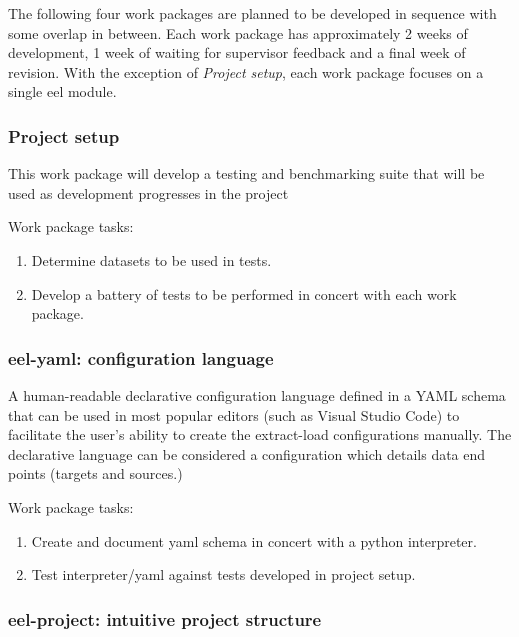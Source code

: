 The following four work packages are planned to be developed in sequence
with some overlap in between. Each work package has approximately 2
weeks of development, 1 week of waiting for supervisor feedback and a
final week of revision. With the exception of \emph{Project setup}, each
work package focuses on a single eel module.

\subsubsection{Project setup}\label{project-setup}

This work package will develop a testing and benchmarking suite that
will be used as development progresses in the project

Work package tasks:

\begin{enumerate}
\def\labelenumi{\arabic{enumi}.}
\tightlist
\item
  Determine datasets to be used in tests.
\item
  Develop a battery of tests to be performed in concert with each work
  package.
\end{enumerate}

\subsubsection{eel-yaml: configuration
language}\label{eel-yaml-configuration-language}

A human-readable declarative configuration language defined in a YAML
schema that can be used in most popular editors (such as Visual Studio
Code) to facilitate the user's ability to create the extract-load
configurations manually. The declarative language can be considered a
configuration which details data end points (targets and sources.)

Work package tasks:

\begin{enumerate}
\def\labelenumi{\arabic{enumi}.}
\tightlist
\item
  Create and document yaml schema in concert with a python interpreter.
\item
  Test interpreter/yaml against tests developed in project setup.
\end{enumerate}

\subsubsection{eel-project: intuitive project
structure}\label{eel-project-intuitive-project-structure}

